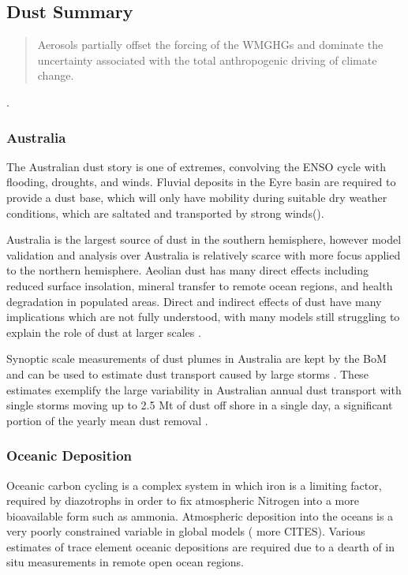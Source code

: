 \subsection{Dust Summary}
\begin{quote}
Aerosols partially offset the forcing of the WMGHGs and dominate the uncertainty associated with the total anthropogenic driving of climate change.
\end{quote} \cite{IPCC_2013_chap8}.
\subsubsection{Australia}

The Australian dust story is one of extremes, convolving the ENSO cycle with flooding, droughts, and winds.
Fluvial deposits in the Eyre basin are required to provide a dust base, which will only have mobility during suitable dry weather conditions, which are saltated and transported by strong winds(\cite{Zender_2003}).

Australia is the largest source of dust in the southern hemisphere, however model validation and analysis over Australia is relatively scarce with more focus applied to the northern hemisphere.
Aeolian dust has many direct effects including reduced surface insolation, mineral transfer to remote ocean regions, and health degradation in populated areas.
Direct and indirect effects of dust have many implications which are not fully understood, with many models still struggling to explain the role of dust at larger scales \cite{Rotstayn_2011}.

Synoptic scale measurements of dust plumes in Australia are kept by the BoM and can be used to estimate dust transport caused by large storms \cite{Leys_2011,Shao_2007}. 
These estimates exemplify the large variability in Australian annual dust transport with single storms moving up to 2.5 Mt of dust off shore in a single day, a significant portion of the yearly mean dust removal \cite{Leys_2011,Shao_2007}.

\subsubsection{Oceanic Deposition}
Oceanic carbon cycling is a complex system in which iron is a limiting factor, required by diazotrophs in order to fix atmospheric Nitrogen into a more bioavailable form such as ammonia.
Atmospheric deposition into the oceans is a very poorly constrained variable in global models (\cite{Grand_2015} more CITES).
Various estimates of trace element oceanic depositions are required due to a dearth of in situ measurements in remote open ocean regions.

